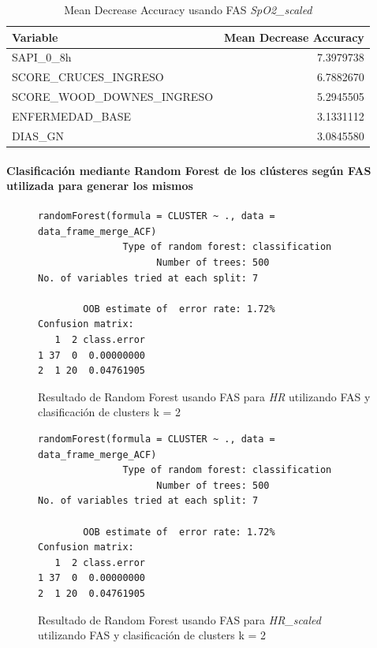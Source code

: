 \begin{table}[H]
    \centering
    \begin{tabular}{lr}
        \toprule
        \textbf{Variable} & \textbf{Mean Decrease Accuracy} \\
        \midrule
        SAPI\_0\_8h & 7.3979738 \\
        SCORE\_CRUCES\_INGRESO & 6.7882670 \\
        SCORE\_WOOD\_DOWNES\_INGRESO & 5.2945505 \\
        ENFERMEDAD\_BASE & 3.1331112 \\
        DIAS\_GN & 3.0845580 \\
        \bottomrule
    \end{tabular}
    \caption{Mean Decrease Accuracy usando FAS \textit{SpO2\_scaled}}
\end{table}


\paragraph{Clasificación mediante Random Forest de los clústeres según FAS utilizada para generar los mismos} 

\begin{figure}[H]
    \centering
    \begin{lstlisting}[frame=single, basicstyle=\small\ttfamily]
        randomForest(formula = CLUSTER ~ ., data = data_frame_merge_ACF) 
               Type of random forest: classification
                     Number of trees: 500
No. of variables tried at each split: 7

        OOB estimate of  error rate: 1.72%
Confusion matrix:
   1  2 class.error
1 37  0  0.00000000
2  1 20  0.04761905
    \end{lstlisting}
    \caption{Resultado de Random Forest usando FAS para \textit{HR} utilizando FAS y clasificación de clusters k = 2}\label{fig:random_forest_acf_result_RF_1}
\end{figure}
\begin{figure}[H]
    \centering
    \begin{lstlisting}[frame=single, basicstyle=\small\ttfamily]
        randomForest(formula = CLUSTER ~ ., data = data_frame_merge_ACF) 
               Type of random forest: classification
                     Number of trees: 500
No. of variables tried at each split: 7

        OOB estimate of  error rate: 1.72%
Confusion matrix:
   1  2 class.error
1 37  0  0.00000000
2  1 20  0.04761905
    \end{lstlisting}
    \caption{Resultado de Random Forest usando FAS para \textit{HR\_scaled} utilizando FAS y clasificación de clusters k = 2}
    \label{fig:random_forest_acf_result_RF_2}
\end{figure}

